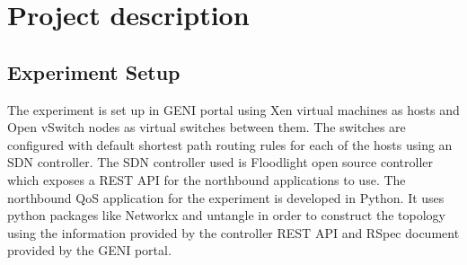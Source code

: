 \documentclass[paper=a4, fontsize=12pt]{scrartcl}	%
\numberwithin{equation}{section}		%
\numberwithin{figure}{section}			%
\numberwithin{table}{section}				%
\begin{document}
\section{Project description}
\subsection{Experiment Setup}
The experiment is set up in GENI portal using Xen virtual machines as hosts and Open vSwitch nodes as virtual switches between them. The switches are configured with default shortest path routing rules for each of the hosts using an SDN controller. The SDN controller used is Floodlight open source controller which exposes a REST API for the northbound applications to use. The northbound QoS application for the experiment is developed in Python. It uses python packages like Networkx and untangle in order to construct the topology using the information provided by the controller REST API and RSpec document provided by the GENI portal. 
\end{document}
